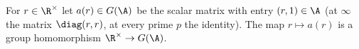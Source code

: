For $r\in\R^\times$ let $a(r)\in G(\A)$ be the scalar matrix with entry $(r,1)\in\A$ (at $\infty$ the matrix $\diag(r,r)$, at every prime $p$ the identity). The map $r\mapsto a(r)$ is a group homomorphism $\R^\times\to G(\A)$.
